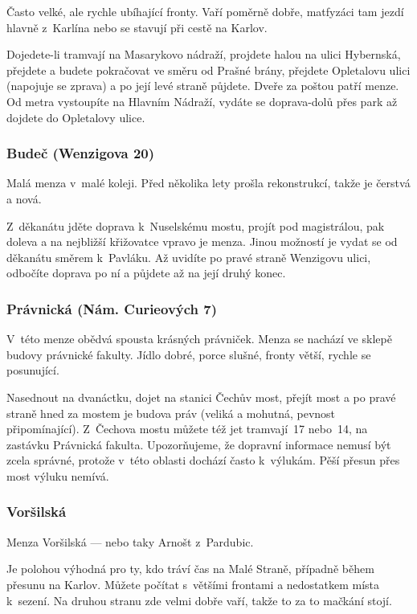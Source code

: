 Často velké, ale rychle ubíhající
fronty. Vaří poměrně dobře, matfyzáci tam jezdí hlavně z~Karlína
nebo se stavují při cestě na Karlov.

Dojedete-li tramvají na Masarykovo
nádraží, projdete halou na ulici Hybernská, přejdete a budete
pokračovat ve směru od Prašné brány, přejdete Opletalovu ulici
(napojuje se zprava) a po její levé straně půjdete. Dveře za
poštou patří menze. Od metra vystoupíte na Hlavním Nádraží, vydáte
se doprava-dolů přes park až dojdete do Opletalovy ulice.

\subsubsection{Budeč (Wenzigova 20)} 

Malá menza v~malé koleji. Před
několika lety prošla rekonstrukcí, takže je čerstvá a nová.

Z~děkanátu jděte doprava k~Nuselskému mostu, projít pod magistrálou,
pak doleva a na nejbližší křižovatce vpravo je menza. Jinou
možností je vydat se od děkanátu směrem k~Pavláku. Až uvidíte po
pravé straně Wenzigovu ulici, odbočíte doprava po ní a půjdete až
na její druhý konec.

\subsubsection{Právnická (Nám. Curieových 7)} 

V~této menze obědvá spousta
krásných právniček. Menza se nachází ve sklepě budovy právnické
fakulty. Jídlo dobré, porce slušné, fronty větší, rychle se
posunující. 

Nasednout na
dvanáctku, dojet na stanici Čechův most, přejít most a po pravé
straně hned za mostem je budova práv (veliká a mohutná, pevnost
připomínající). Z~Čechova mostu můžete též jet tramvají~17
nebo~14, na zastávku Právnická fakulta. Upozorňujeme, že dopravní
informace nemusí být zcela správné, protože v~této oblasti dochází
často k~výlukám. Pěší přesun přes most výluku nemívá.

\subsubsection{Voršilská} 
Menza Voršilská --- nebo taky Arnošt z~Pardubic.

Je polohou výhodná pro ty, kdo tráví čas na Malé Straně, případně během přesunu na Karlov. Můžete počítat s~většími frontami a nedostatkem místa k~sezení. Na druhou stranu zde velmi dobře vaří, takže to za to mačkání stojí.

